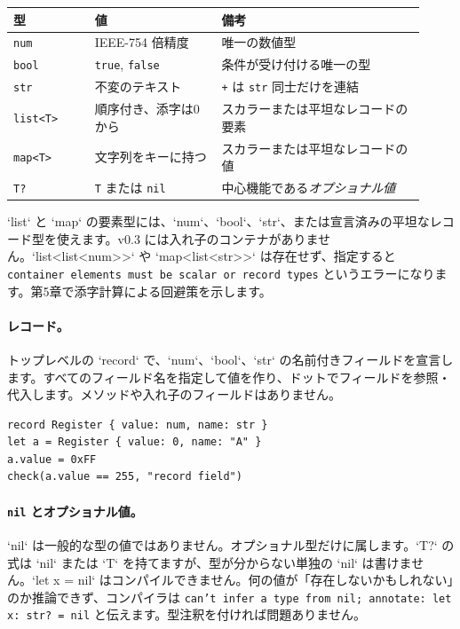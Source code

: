 \begin{center}
\begin{tabular}{@{}p{0.18\linewidth}p{0.29\linewidth}p{0.45\linewidth}@{}}
\toprule
\textbf{型} & \textbf{値} & \textbf{備考} \\
\midrule
\texttt{num} & IEEE-754 倍精度 & 唯一の数値型 \\
\texttt{bool} & \texttt{true}, \texttt{false} & 条件が受け付ける唯一の型 \\
\texttt{str} & 不変のテキスト & \texttt{+} は \texttt{str} 同士だけを連結 \\
\texttt{list<T>} & 順序付き、添字は0から & スカラーまたは平坦なレコードの要素 \\
\texttt{map<T>} & 文字列をキーに持つ & スカラーまたは平坦なレコードの値 \\
\texttt{T?} & \texttt{T} または \texttt{nil} & 中心機能である\emph{オプショナル値} \\
\bottomrule
\end{tabular}
\end{center}

`list` と `map` の要素型には、`num`、`bool`、`str`、または宣言済みの平坦なレコード型を使えます。v0.3 には入れ子のコンテナがありません。`list<list<num>>` や `map<list<str>>` は存在せず、指定すると \texttt{container elements must be scalar or record types} というエラーになります。第5章で添字計算による回避策を示します。

\paragraph{レコード。} トップレベルの `record` で、`num`、`bool`、`str` の名前付きフィールドを宣言します。すべてのフィールド名を指定して値を作り、ドットでフィールドを参照・代入します。メソッドや入れ子のフィールドはありません。

\begin{lstlisting}[language=wick]
record Register { value: num, name: str }
let a = Register { value: 0, name: "A" }
a.value = 0xFF
check(a.value == 255, "record field")
\end{lstlisting}

\paragraph{\texttt{nil} とオプショナル値。} `nil` は一般的な型の値ではありません。オプショナル型だけに属します。`T?` の式は `nil` または `T` を持てますが、型が分からない単独の `nil` は書けません。`let x = nil` はコンパイルできません。何の値が「存在しないかもしれない」のか推論できず、コンパイラは \texttt{can't infer a type from nil; annotate: let x: str? = nil} と伝えます。型注釈を付ければ問題ありません。

